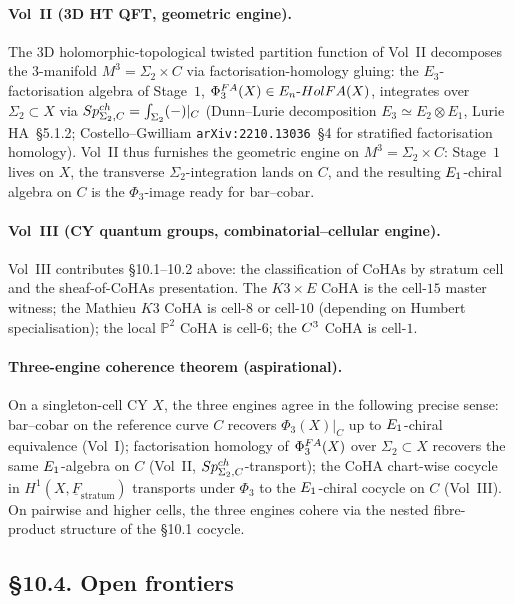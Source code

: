 \paragraph{Vol~II (3D HT QFT, geometric engine).} The 3D
holomorphic-topological twisted partition function of Vol~II decomposes
the 3-manifold $M^{3}=\Sigma_{2}\times C$ via factorisation-homology
gluing: the $E_{3}$-factorisation algebra of Stage~$1$, $\Phi^{FA}_{3}(X)
\in E_n\text{-}HolFA(X)$, integrates over $\Sigma_{2}\subset X$ via
$Sp^{ch}_{\Sigma_{2},C}=\int_{\Sigma_{2}}(-)|_{C}$ (Dunn--Lurie
decomposition $E_{3}\simeq E_{2}\otimes E_{1}$, Lurie HA~\S 5.1.2;
Costello--Gwilliam \texttt{arXiv:2210.13036}~\S 4 for stratified
factorisation homology). Vol~II thus furnishes the geometric engine
on $M^{3}=\Sigma_{2}\times C$: Stage~$1$ lives on $X$, the transverse
$\Sigma_{2}$-integration lands on $C$, and the resulting
$E_{1}$-chiral algebra on $C$ is the $\Phi_{3}$-image ready for
bar--cobar.

\paragraph{Vol~III (CY quantum groups, combinatorial--cellular engine).}
Vol~III contributes \S 10.1--10.2 above: the classification of CoHAs
by stratum cell and the sheaf-of-CoHAs presentation. The $K3\times E$
CoHA is the cell-$15$ master witness; the Mathieu $K3$ CoHA is
cell-$8$ or cell-$10$ (depending on Humbert specialisation); the
local $\mathbb{P}^{2}$ CoHA is cell-$6$; the $C^{3}$ CoHA is
cell-$1$.

\paragraph{Three-engine coherence theorem (aspirational).} On a
singleton-cell CY $X$, the three engines agree in the following
precise sense: bar--cobar on the reference curve $C$ recovers
$\Phi_{3}(X)|_{C}$ up to $E_{1}$-chiral equivalence (Vol~I);
factorisation homology of $\Phi^{FA}_{3}(X)$ over $\Sigma_{2}\subset X$
recovers the same $E_{1}$-algebra on $C$ (Vol~II,
$Sp^{ch}_{\Sigma_{2},C}$-transport); the CoHA chart-wise cocycle in
$H^{1}(X,\underline{F}_{\mathrm{stratum}})$ transports under
$\Phi_{3}$ to the $E_{1}$-chiral cocycle on $C$ (Vol~III). On
pairwise and higher cells, the three engines cohere via the nested
fibre-product structure of the \S 10.1 cocycle.

\subsection*{\S 10.4. Open frontiers}
\label{gluing:sec:10-4-open-frontiers}

